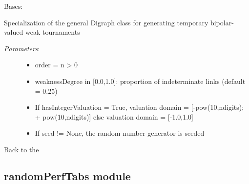 \documentclass[letterpaper,10pt,english]{sphinxmanual}
\begin{document}

\begin{fulllineitems}
\label{techDoc:randomDigraphs.RandomWeakTournament}
Bases: {\hyperref[techDoc:digraphs.Digraph]{\emph{}}}

Specialization of the general Digraph class for generating
temporary bipolar-valued weak tournaments
\begin{description}
\item[{\emph{Parameters}:}] \leavevmode\begin{itemize}
\item {} 
order = n \textgreater{} 0

\item {} 
weaknessDegree in {[}0.0,1.0{]}: proportion of indeterminate links (default = 0.25)

\item {} 
If hasIntegerValuation = True,
valuation domain = {[}-pow(10,ndigits); + pow(10,ndigits){]}
else valuation domain = {[}-1.0,1.0{]}

\item {} 
If seed != None, the random number generator is seeded

\end{itemize}

\end{description}

\end{fulllineitems}


Back to the {\hyperref[techDoc:technical-label]{\emph{}}}


\subsection{randomPerfTabs module}
\label{techDoc:randomperftabs-label}\label{techDoc:randomperftabs-module}\label{techDoc:module-randomPerfTabs}
\end{document}
